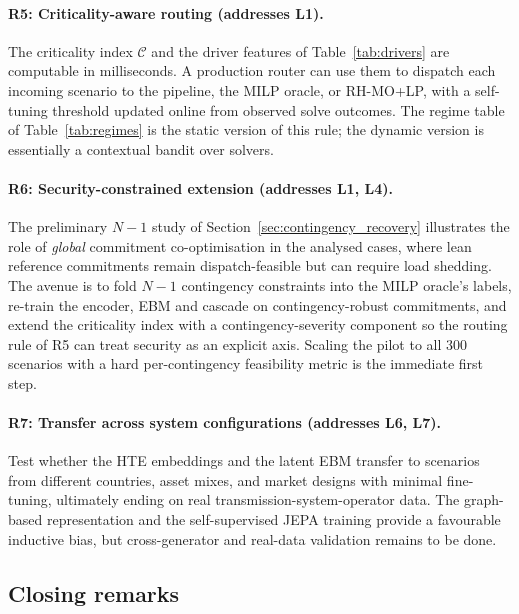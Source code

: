 \documentclass{article}
\begin{document}
\paragraph{R5: Criticality-aware routing (addresses L1).}
The criticality index $\mathcal{C}$ and the driver features of Table~\ref{tab:drivers} are computable in milliseconds. A production router can use them to dispatch each incoming scenario to the pipeline, the MILP oracle, or RH-MO+LP, with a self-tuning threshold updated online from observed solve outcomes. The regime table of Table~\ref{tab:regimes} is the static version of this rule; the dynamic version is essentially a contextual bandit over solvers.

\paragraph{R6: Security-constrained extension (addresses L1, L4).}
The preliminary $N{-}1$ study of Section~\ref{sec:contingency_recovery} illustrates the role of \emph{global} commitment co-optimisation in the analysed cases, where lean reference commitments remain dispatch-feasible but can require load shedding. The avenue is to fold $N{-}1$ contingency constraints into the MILP oracle's labels, re-train the encoder, EBM and cascade on contingency-robust commitments, and extend the criticality index with a contingency-severity component so the routing rule of R5 can treat security as an explicit axis. Scaling the pilot to all $300$ scenarios with a hard per-contingency feasibility metric is the immediate first step.

\paragraph{R7: Transfer across system configurations (addresses L6, L7).}
Test whether the HTE embeddings and the latent EBM transfer to scenarios from different countries, asset mixes, and market designs with minimal fine-tuning, ultimately ending on real transmission-system-operator data. The graph-based representation and the self-supervised JEPA training provide a favourable inductive bias, but cross-generator and real-data validation remains to be done.


\subsection{Closing remarks}
\end{document}

